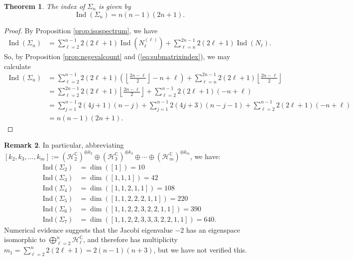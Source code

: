 \documentclass[11pt]{article}
\newcommand{\C}{\mathbb{C}}
\newcommand{\Hc}{\mathcal{H}}
\newtheorem{thm}{Theorem}[section]
\theoremstyle{definition}
\newtheorem{rmk}[thm]{Remark}
\numberwithin{equation}{section}
\begin{document}
\begin{thm} \label{thm:IndexResult}
    The index of $\Sigma_n$ is given by
    \begin{equation*}
        \operatorname{Ind}(\Sigma_n) = n(n-1)(2n+1).
    \end{equation*}
\end{thm}

\begin{proof}
    By Proposition \ref{prop:isospectrum}, we have
    \begin{equation*}
    \begin{aligned}
        \operatorname{Ind}(\Sigma_n) &= \sum_{\ell = 2}^{n-1} 2 ( 2 \ell + 1) \operatorname{Ind}(N_\ell^{(\ell)}) + \sum_{\ell = n}^{2n - 1} 2 (2\ell + 1) \operatorname{Ind}(N_{\ell}).
            \end{aligned}
    \end{equation*}
So, by Proposition \ref{prop:negevalcount} and (\ref{eq:submatrixindex}), we may calculate
        \begin{equation*}
    \begin{aligned}
    \operatorname{Ind}(\Sigma_n) & = \sum_{\ell = 2}^{n-1} 2 ( 2 \ell + 1) \left( \left\lfloor \frac{2n-\ell}{2} \right\rfloor - n + \ell \right) + \sum_{\ell = n}^{2n - 1} 2 (2\ell + 1)  \left\lfloor \frac{2n-\ell}{2} \right\rfloor  \\
        & = \sum_{\ell = 2}^{2n-1} 2 ( 2 \ell + 1)  \left\lfloor \frac{2n-\ell}{2} \right\rfloor  + \sum_{\ell = 2}^{n - 1} 2 (2\ell + 1) (-n+\ell) \\
       & = \sum_{j = 1}^{n-1} 2 ( 4j + 1)(n-j)  + \sum_{j = 1}^{n-1} 2 (4j + 3)(n-j-1)  + \sum_{\ell = 2}^{n - 1} 2 (2\ell + 1) (-n+\ell) \\
        & = n(n-1)(2n+1).
    \end{aligned}
    \end{equation*}
\end{proof}

\begin{rmk} In particular, abbreviating $[k_2, k_3, \ldots, k_m] := (\Hc_2^{\C})^{\oplus k_2} \oplus (\Hc_3^{\C})^{\oplus k_3}  \oplus \cdots \oplus (\Hc_m^\C)^{\oplus k_m}$, we have:
\begin{align*}
\mathrm{Ind}(\Sigma_2) & = \dim( [1]) = 10 \\
\mathrm{Ind}(\Sigma_3) & = \dim( [1, 1, 1] ) = 42 \\
\mathrm{Ind}(\Sigma_4) & = \dim( [1,1, 2, 1,1]) = 108 \\
\mathrm{Ind}(\Sigma_5) & = \dim( [1,1,2,2,2,1,1]) = 220 \\
\mathrm{Ind}(\Sigma_6) & = \dim( [1,1,2,2,3,2,2,1,1] ) = 390 \\
\mathrm{Ind}(\Sigma_7) & = \dim( [1,1,2,2,3,3,3,2,2,1,1] ) = 640.
\end{align*}
Numerical evidence suggests that the Jacobi eigenvalue $-2$ has an eigenspace isomorphic to $\bigoplus_{\ell = 2}^n \mathcal{H}_\ell^\C$, and therefore has multiplicity $m_1 = \sum_{\ell = 2}^n 2(2\ell + 1) = 2(n-1)(n+3)$, but we have not verified this. 
\end{rmk}
\end{document}
